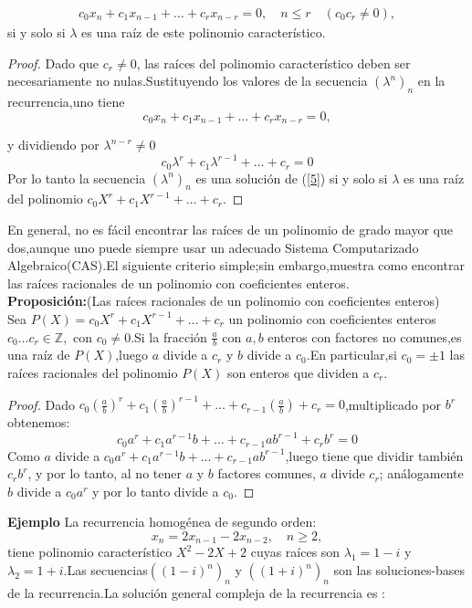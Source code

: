 \begin{align}\label{5}
c_{0}x_{n}+c_{1}x_{n-1}+\ldots+c_{r}x_{n-r}=0,\quad n\leq r \quad (c_{0}c_{r}\neq 0),
\end{align}
si y solo si $ \lambda $ es una raíz de este polinomio característico.
\begin{proof}
Dado que $ c_{r}\neq 0 $, las raíces del polinomio característico deben ser necesariamente no nulas.Sustituyendo los valores de la secuencia $ (\lambda^{n})_{n} $ en la recurrencia,uno tiene
$$
c_{0}x_{n}+c_{1}x_{n-1}+\ldots+c_{r}x_{n-r}=0,
$$

y dividiendo por $ \lambda^{n-r}\neq 0$
$$
c_{0}\lambda^{r}+c_{1}\lambda^{r-1}+\ldots+c_{r}=0
$$
Por lo tanto la secuencia $ (\lambda^{n})_{n} $ es una solución de (\ref{5}) si y solo si $ \lambda $ es una raíz del polinomio $c_{0}X^{r}+c_{1}X^{r-1}+\ldots+c_{r}  .$
\end{proof}
En general, no es fácil encontrar las raíces de un polinomio de grado mayor que dos,aunque uno puede siempre usar un adecuado Sistema Computarizado Algebraico(CAS).El siguiente criterio simple;sin embargo,muestra como encontrar las raíces racionales de un polinomio con coeficientes enteros.\\
{\bf Proposición:}(Las raíces racionales de un polinomio con coeficientes enteros)\\
Sea $ P(X)=c_{0}X^{r}+c_{1}X^{r-1}+\ldots+c_{r}$ un polinomio con coeficientes enteros $ c_{0}\ldots c_{r} \in \mathbb{Z}, $ con $ c_{0}\neq 0 $.Si la fracción $\frac{a}{b} $ con $ a,b $ enteros con factores no comunes,es una raíz de $ P(X) $,luego $ a $ divide a $ c_{r} $
 y $ b $ divide a $ c_{0} $.En particular,si $ c_{0}=\pm 1 $ las raíces racionales del polinomio $ P(X) $ son enteros que dividen a $ c_{r} .$
 \begin{proof}
 Dado $ c_{0}\left(\frac{a}{b}\right)^{r} + c_{1}\left( \frac{a}{b}\right )^{r-1} + \ldots + c_{r-1}\left (\frac{a}{b}\right)+c_{r}=0 $,multiplicado por $ b^{r} $ obtenemos:
 $$
 c_{0}a^{r}+c_{1}a^{r-1}b+\ldots+c_{r-1}ab^{r-1}+c_{r}b^{r}=0
 $$
 Como $ a $ divide a $c_{0}a^{r}+c_{1}a^{r-1}b+\ldots+c_{r-1}ab^{r-1}  $,luego tiene que dividir también $ c_{r}b^{r} $, y por lo tanto, al no tener $ a $ y $ b $ factores comunes, $ a $ divide $ c_{r} $; análogamente $ b $ divide a $ c_{0}a^{r} $ y por lo tanto divide a $ c_{0} $.
 \end{proof}
{\bf Ejemplo }La recurrencia homogénea de segundo orden:
$$
x_{n}=2x_{n-1}-2x_{n-2}, \quad n\geq 2,
$$
tiene polinomio característico $ X^{2}-2X+2 $ cuyas raíces son $ \lambda_{1}=1-i $ y $ \lambda_{2}=1+i $.Las secuencias$ ((1-i)^{n})_{n} $ y $ ((1+i)^{n})_{n} $ son las soluciones-bases de la recurrencia.La solución general compleja de la recurrencia es :

